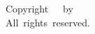 \vspace*{3in}
\begin{singlespace}
    \begin{center}
        Copyright~\textcopyright{}~\DissertationYear{}~by~\AuthorName{}\\
        All~rights~reserved.
    \end{center}
\end{singlespace}